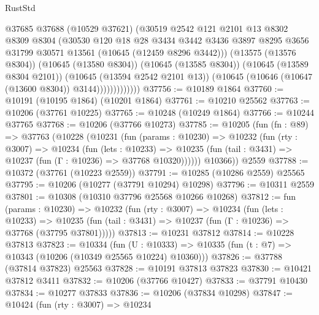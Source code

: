 \begin{lexlean}{RustStd}
\begin{coremodule}
                        @37685
                        @37688
                        (@10529 @37621)
                        (@30519
                          @2542
                          @121
                          @2101
                          @13
                          @8302
                          @8309
                          @8304
                          (@30530
                            @120
                            @18
                            @28
                            @3434
                            @3442
                            @3436
                            @3897
                            @8295
                            @3656
                            @31799
                            @30571
                            @13561
                            (@10645 (@12459 @8296 @3442)))
                          (@13575 (@13576 @8304))
                          (@10645 (@13580 @8304))
                          (@10645 (@13585 @8304))
                          (@10645 (@13589 @8304 @2101))
                          (@10645 (@13594 @2542 @2101 @13))
                          (@10645 (@10646 (@10647 (@13600 @8304)) @3144)))))))))))))
@37756 := @10189 @1864
@37760 := @10191 (@10195 @1864) (@10201 @1864)
@37761 := @10210 @25562
@37763 := @10206 (@37761 @10225)
@37765 := @10248 (@10249 @1864)
@37766 := @10244 @37765
@37768 := @10206 (@37766 @10273)
@37785 := @10205
    (fun (fn : @89) =>
    @37763
      (@10228
        (@10231
          (fun (params : @10230) =>
          @10232
            (fun (rty : @3007) =>
            @10234
              (fun (lets : @10233) =>
              @10235 (fun (tail : @3431) => @10237 (fun (Γ : @10236) => @37768 @10320))))))
        @10366))
    @2559
@37788 := @10372 (@37761 (@10223 @2559))
@37791 := @10285 (@10286 @2559) @25565
@37795 := @10206 (@10277 (@37791 @10294) @10298)
@37796 := @10311 @2559
@37801 := @10308 (@10310 @37796 @25568 @10266 @10268)
@37812 := fun (params : @10230) =>
  @10232
    (fun (rty : @3007) =>
    @10234
      (fun (lets : @10233) =>
      @10235 (fun (tail : @3431) => @10237 (fun (Γ : @10236) => @37768 (@37795 @37801)))))
@37813 := @10231 @37812
@37814 := @10228 @37813
@37823 := @10334
    (fun (U : @10333) => @10335 (fun (t : @7) => @10343 (@10206 (@10349 @25565 @10224) @10360)))
@37826 := @37788 (@37814 @37823) @25563
@37828 := @10191 @37813 @37823
@37830 := @10421 @37812 @3411
@37832 := @10206 (@37766 @10427)
@37833 := @37791 @10430
@37834 := @10277 @37833
@37836 := @10206 (@37834 @10298)
@37847 := @10424
    (fun (rty : @3007) =>
    @10234

\end{coremodule}
\end{lexlean}
